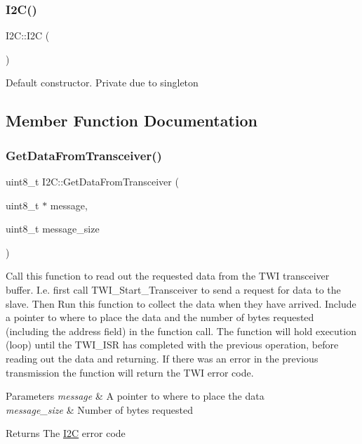 \subsubsection{\texorpdfstring{I2\+C()}{I2C()}}
{\footnotesize\ttfamily I2\+C\+::\+I2C (\begin{DoxyParamCaption}{ }\end{DoxyParamCaption})\hspace{0.3cm}{\ttfamily [private]}}

Default constructor. Private due to singleton 

\subsection{Member Function Documentation}
\hypertarget{class_i2_c_a2023e5108a9bfb4ac09f509f74137307}{}\label{class_i2_c_a2023e5108a9bfb4ac09f509f74137307} 
\subsubsection{\texorpdfstring{Get\+Data\+From\+Transceiver()}{GetDataFromTransceiver()}}
{\footnotesize\ttfamily uint8\+\_\+t I2\+C\+::\+Get\+Data\+From\+Transceiver (\begin{DoxyParamCaption}\item[{uint8\+\_\+t $\ast$}]{message,  }\item[{uint8\+\_\+t}]{message\+\_\+size }\end{DoxyParamCaption})}

Call this function to read out the requested data from the T\+WI transceiver buffer. I.\+e. first call T\+W\+I\+\_\+\+Start\+\_\+\+Transceiver to send a request for data to the slave. Then Run this function to collect the data when they have arrived. Include a pointer to where to place the data and the number of bytes requested (including the address field) in the function call. The function will hold execution (loop) until the T\+W\+I\+\_\+\+I\+SR has completed with the previous operation, before reading out the data and returning. If there was an error in the previous transmission the function will return the T\+WI error code. 
\begin{DoxyParams}{Parameters}
{\em message} & A pointer to where to place the data \\
\hline
{\em message\+\_\+size} & Number of bytes requested \\
\hline
\end{DoxyParams}
\begin{DoxyReturn}{Returns}
The \hyperlink{class_i2_c}{I2C} error code 
\end{DoxyReturn}
\hypertarget{class_i2_c_ade3b5d971432c82867201123965cf3fd}{}\label{class_i2_c_ade3b5d971432c82867201123965cf3fd} 
